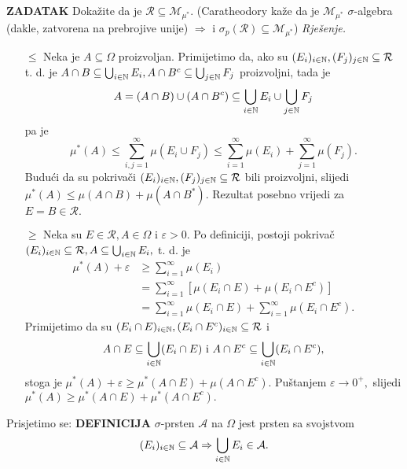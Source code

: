 \documentclass{article}
\begin{document}
\textbf{ZADATAK}\newline
Dokažite da je \(\mathcal R\subseteq\mathcal M_{\mu^*}.\) (Caratheodory kaže da je \(\mathcal M_{\mu^*}\) \(\sigma\)-algebra (dakle, zatvorena na prebrojive unije) \(\Rightarrow\) i \(\sigma_p(\mathcal R)\subseteq\mathcal M_{\mu^*}\))\newline\newline 
\textit{Rješenje.}
\begin{itemize}
    \item[\(\boxed{\le}\)] Neka je \(A\subseteq\Omega\) proizvoljan. Primijetimo da, ako su \((E_i)_{i\in\Bbb N},(F_j)_{j\in\Bbb 
      N}\subseteq\mathcal R\) t. d. je \newline \(A\cap B\subseteq\bigcup_{i\in\Bbb N}E_i,A\cap B^c\subseteq\bigcup_{j\in\Bbb N} F_j\) proizvoljni, tada je \[A=(A\cap B)\cup(A\cap B^c)\subseteq\bigcup_{i\in\Bbb N}E_i\cup\bigcup_{j\in\Bbb N}F_j\] pa je \[\mu^*(A)\le\sum_{i,j=1}^\infty\mu(E_i\cup F_j)\le\sum_{i=1}^\infty\mu(E_i)+\sum_{j=1}^\infty\mu(F_j).\] Budući da su pokrivači \((E_i)_{i\in\Bbb N},(F_j)_{j\in\Bbb N}\subseteq\mathcal R\) bili proizvoljni, slijedi \(\mu^*(A)\le\mu(A\cap B)+\mu(A\cap B^*).\) Rezultat posebno vrijedi za \(E=B\in\mathcal R.\) 
      \item[\(\boxed{\ge}\)] Neka su \(E\in\mathcal R, A\in\Omega\) i \(\varepsilon>0.\) Po definiciji, postoji pokrivač \((E_i)_{i\in\Bbb N}\subseteq\mathcal R, A\subseteq\bigcup_{i\in\Bbb N}E_i,\) t. d. je \[\begin{aligned}\mu^*(A)+\varepsilon&\ge\sum_{i=1}^\infty\mu(E_i)\\&=\sum_{i=1}^\infty\left[\mu(E_i\cap E)+\mu(E_i\cap E^c)\right]\\&=\sum_{i=1}^\infty\mu(E_i\cap E)+\sum_{i=1}^\infty\mu(E_i\cap E^c).\end{aligned}\] Primijetimo da su \((E_i\cap E)_{i\in\Bbb N},(E_i\cap E^c)_{i\in\Bbb N}\subseteq\mathcal R\) i \[A\cap E\subseteq\bigcup_{i\in\Bbb N}(E_i\cap E)\text{ i }A\cap E^c\subseteq\bigcup_{i\in\Bbb N}(E_i\cap E^c),\] stoga je \(\mu^*(A)+\varepsilon\ge\mu^*(A\cap E)+\mu(A\cap E^c).\) Puštanjem \(\varepsilon\to 0^+,\) slijedi \(\mu^*(A)\ge\mu^*(A\cap E)+\mu^*(A\cap E^c).\) 
\end{itemize}
Prisjetimo se:\newline\newline
\textbf{DEFINICIJA}\newline
\(\sigma\)-prsten \(\mathcal A\) na \(\Omega\) jest prsten sa svojstvom \[(E_i)_{i\in\Bbb N}\subseteq\mathcal A\Rightarrow\bigcup_{i\in\Bbb N}E_i\in\mathcal A.\] 
\end{document}
